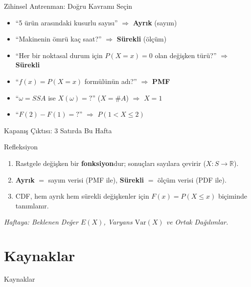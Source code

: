 ﻿\documentclass[light]{lutbeamer}
\begin{document}
\begin{frame}[fragile]{Zihinsel Antrenman: Doğru Kavramı Seçin}
    \begin{itemize}[<+->]
        \item ``5 ürün arasındaki kusurlu sayısı'' $\Rightarrow$ \textbf{Ayrık} (sayım)
        \item ``Makinenin ömrü kaç saat?'' $\Rightarrow$ \textbf{Sürekli} (ölçüm)
        \item ``Her bir noktasal durum için $P(X = x) = 0$ olan değişken türü?'' $\Rightarrow$ \textbf{Sürekli}
        \item ``$f(x) = P(X = x)$ formülünün adı?'' $\Rightarrow$ \textbf{PMF}
        \item ``$\omega = SSA$ ise $X(\omega) = ?$'' ($X = \#A$) $\Rightarrow$ $X = 1$
        \item ``$F(2) - F(1) = ?$'' $\Rightarrow$ $P(1 < X \le 2)$
    \end{itemize}
\end{frame}

\begin{frame}{Kapanış Çıktısı: 3 Satırda Bu Hafta}
    \begin{block}{Refleksiyon}
        \begin{enumerate}
            \item Rastgele değişken bir \textbf{fonksiyon}dur; sonuçları sayılara çevirir ($X: S \to \mathbb{R}$).
            \item \textbf{Ayrık} $=$ sayım verisi (PMF ile), \textbf{Sürekli} $=$ ölçüm verisi (PDF ile).
            \item CDF, hem ayrık hem sürekli değişkenler için $F(x) = P(X \le x)$ biçiminde tanımlanır.
        \end{enumerate}
    \end{block}

    \vspace{0.3cm}
    \centering
    \textit{Haftaya: Beklenen Değer $E(X)$, Varyans $\mathrm{Var}(X)$ ve Ortak Dağılımlar.}
\end{frame}

\section{Kaynaklar}
\begin{frame}[allowframebreaks]{Kaynaklar}
    \nocite{*}
    \printbibliography{}
\end{frame}
\end{document}
